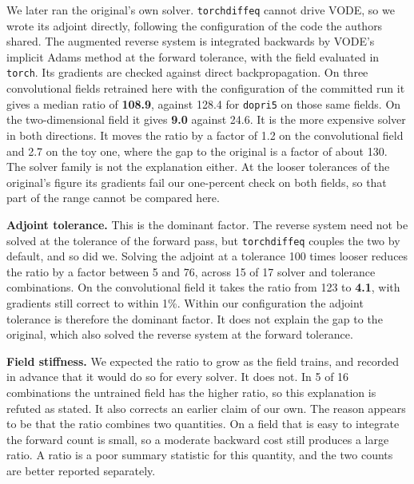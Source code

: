 We later ran the original's own solver. \texttt{torchdiffeq} cannot drive VODE, so we wrote its adjoint directly, following the configuration of the
code the authors shared. The augmented reverse system is integrated backwards by VODE's implicit
Adams method at the forward tolerance, with the field evaluated in \texttt{torch}. Its gradients
are checked against direct backpropagation. On three convolutional fields retrained here with the
configuration of the committed run it gives a median ratio of \textbf{108.9}, against 128.4 for
\texttt{dopri5} on those same fields. On the two-dimensional field it gives \textbf{9.0} against
24.6. It is the more expensive solver in both directions. It moves the ratio by a factor of 1.2
on the convolutional field and 2.7 on the toy one, where the gap to the original is a factor of
about 130. The solver family is not the explanation either.
At the looser tolerances of the original's figure its gradients fail our one-percent check on
both fields, so that part of the range cannot be compared here.

\textbf{Adjoint tolerance.} This is the dominant factor. The reverse system need not be solved
at the tolerance of the forward pass, but \texttt{torchdiffeq} couples the two by default, and
so did we. Solving the adjoint at a tolerance 100 times looser reduces the ratio by a factor
between 5 and 76, across 15 of 17 solver and tolerance combinations. On the convolutional
field it takes the ratio from 123 to \textbf{4.1}, with gradients still correct to within 1\%.
Within our configuration the adjoint tolerance is therefore the dominant factor. It does not
explain the gap to the original, which also solved the reverse system at the forward tolerance.

\textbf{Field stiffness.} We expected the ratio to grow as the field trains, and recorded in
advance that it would do so for every solver. It does not. In 5 of 16 combinations the
untrained field has the higher ratio, so this explanation is refuted as stated. It also
corrects an earlier claim of our own. The reason appears to be that the ratio combines two
quantities. On a field that is easy to integrate the forward count is small, so a moderate
backward cost still produces a large ratio. A ratio is a poor summary statistic for this
quantity, and the two counts are better reported separately.

